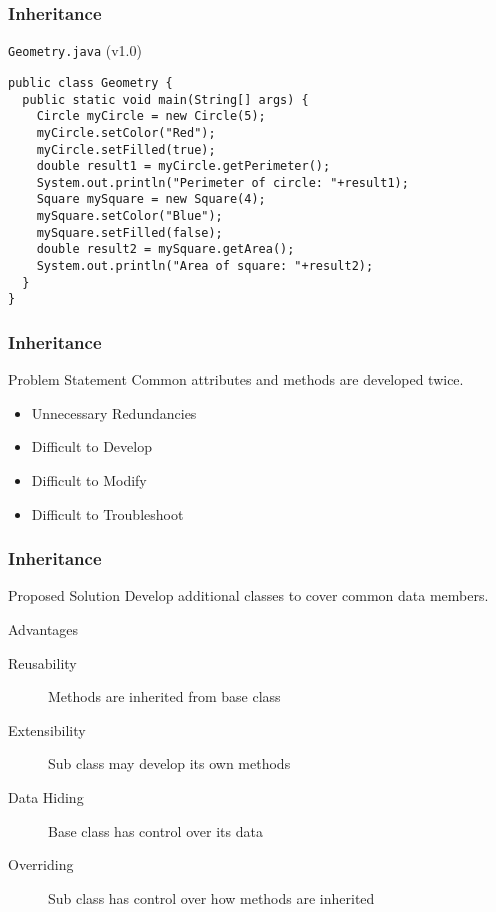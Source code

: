 \documentclass[10pt, compress]{beamer}
\begin{document}
\begin{frame}[fragile]
  \frametitle{Inheritance}
  \begin{block}{\texttt{Geometry.java} (v1.0)}
    \begin{verbatim}
public class Geometry {
  public static void main(String[] args) {
    Circle myCircle = new Circle(5);
    myCircle.setColor("Red");
    myCircle.setFilled(true);
    double result1 = myCircle.getPerimeter();
    System.out.println("Perimeter of circle: "+result1);
    Square mySquare = new Square(4);
    mySquare.setColor("Blue");
    mySquare.setFilled(false);
    double result2 = mySquare.getArea();
    System.out.println("Area of square: "+result2);
  }
}
    \end{verbatim}
  \end{block}
\end{frame}

\begin{frame}[fragile]
  \frametitle{Inheritance}
  \begin{block}{Problem Statement}
  Common attributes and methods are developed twice.
  \begin{itemize}
    \item[] Unnecessary Redundancies
    \item[] Difficult to Develop
    \item[] Difficult to Modify
    \item[] Difficult to Troubleshoot
  \end{itemize}
  \end{block}
\end{frame}

\begin{frame}[fragile]
  \frametitle{Inheritance}
  \begin{block}{Proposed Solution}
    Develop additional classes to cover common data members.
  \end{block}
  \begin{block}{Advantages}
  \begin{description}
    \item[Reusability] Methods are inherited from base class
    \item[Extensibility] Sub class may develop its own methods
    \item[Data Hiding] Base class has control over its data
    \item[Overriding] Sub class has control over how methods are inherited
  \end{description}
  \end{block}
\end{frame}
\end{document}
